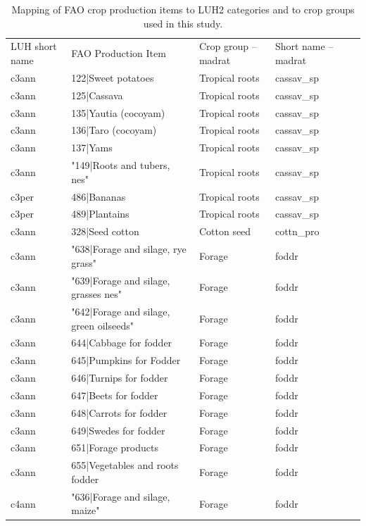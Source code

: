 \documentclass[gc, manuscript]{copernicus}
\begin{document}
\begin{table}[htbp]
  \centering
  \caption{Mapping of FAO crop production items \citep{faostat_faostat_2016} to LUH2 categories \citep{hurtt_harmonization_2020} and to crop groups used in this study.}
  \begin{tabular}{lllll}
  \tophline
      LUH short name & FAO Production Item & Crop group – madrat & Short name – madrat \\ 
  \middlehline    
      c3ann & 122|Sweet potatoes & Tropical roots & cassav\_sp \\ 
      c3ann & 125|Cassava & Tropical roots & cassav\_sp \\ 
      c3ann & 135|Yautia (cocoyam) & Tropical roots & cassav\_sp \\ 
      c3ann & 136|Taro (cocoyam) & Tropical roots & cassav\_sp \\ 
      c3ann & 137|Yams & Tropical roots & cassav\_sp \\ 
      c3ann & "149|Roots and tubers, nes" & Tropical roots & cassav\_sp \\ 
      c3per & 486|Bananas & Tropical roots & cassav\_sp \\ 
      c3per & 489|Plantains & Tropical roots & cassav\_sp \\ 
      c3ann & 328|Seed cotton & Cotton seed & cottn\_pro \\ 
      c3ann & "638|Forage and silage, rye grass" & Forage & foddr \\ 
      c3ann & "639|Forage and silage, grasses nes" & Forage & foddr \\ 
      c3ann & "642|Forage and silage, green oilseeds" & Forage & foddr \\ 
      c3ann & 644|Cabbage for fodder & Forage & foddr \\ 
      c3ann & 645|Pumpkins for Fodder & Forage & foddr \\ 
      c3ann & 646|Turnips for fodder & Forage & foddr \\ 
      c3ann & 647|Beets for fodder & Forage & foddr \\ 
      c3ann & 648|Carrots for fodder & Forage & foddr \\ 
      c3ann & 649|Swedes for fodder & Forage & foddr \\ 
      c3ann & 651|Forage products & Forage & foddr \\ 
      c3ann & 655|Vegetables and roots fodder & Forage & foddr \\ 
      c4ann & "636|Forage and silage, maize" & Forage & foddr \\ 

\end{tabular}
\end{table}
\end{document}
